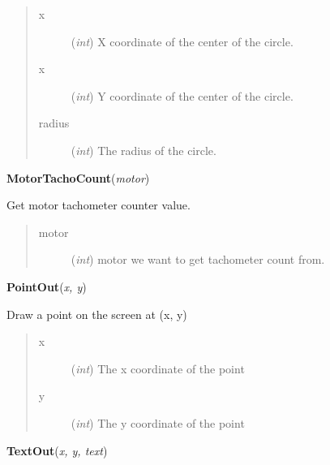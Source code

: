 \documentclass[10pt,a4paper]{article}
\begin{document}
    
    

\begin{quote}
    \begin{description}
        
\item[x] ({\emph{int}}) X coordinate of the center of the circle.

\item[x] ({\emph{int}}) Y coordinate of the center of the circle.

\item[radius] ({\emph{int}}) The radius of the circle.

    \end{description}
\end{quote}

 

\vspace{6pt}
{\bf MotorTachoCount}({\it motor}) 
    
    Get motor tachometer counter value.


    

\begin{quote}
    \begin{description}
        
\item[motor] ({\emph{int}}) motor we want to get tachometer count from.

    \end{description}
\end{quote}

 

\vspace{6pt}
{\bf PointOut}({\it x, y}) 
    
    Draw a point on the screen at (x, y)



    

\begin{quote}
    \begin{description}
        
\item[x] ({\emph{int}}) The x coordinate of the point

\item[y] ({\emph{int}}) The y coordinate of the point

    \end{description}
\end{quote}

 

\vspace{6pt}
{\bf TextOut}({\it x, y, text}) 
    
\end{document}
